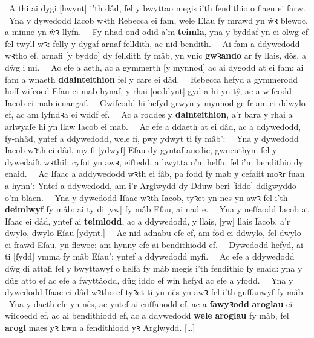 \begin{Parallel}{0.425\textwidth}{0.545\textwidth}
{	~A thi ai dygi [hwynt] i’th dâd, fel y bwyttao megis i’th fendithio o flaen ei farw.\ %
	~Yna y dywedodd Iacob wꝛth Rebecca ei fam, wele Eſau fy mrawd yn ŵꝛ blewoc, a minne yn ŵꝛ llyfn.\ %
	~Fy nhad ond odid a’m \textbf{teimla}, yna y byddaf yn ei olwg ef fel twyll-wꝛ: felly y dygaf arnaf felldith, ac nid bendith.\ %
	~Ai fam a ddywedodd wꝛtho ef, arnafi [y byddo] dy felldith fy mâb, yn vnic \textbf{gwꝛando} ar fy llais, dôs, a dŵg i mi.\ %
	~Ac efe a aeth, ac a gymmerth [y mynnod] ac ai dygodd at ei fam: ai fam a wnaeth \textbf{ddainteithion} fel y care ei dâd.\ %
	~Rebecca hefyd a gymmerodd hoff wiſcoed Eſau ei mab hynaf, y rhai [oeddynt] gyd a hi yn tŷ, ac a wiſcodd Iacob ei mab ieuangaf.\ %
	~Gwiſcodd hi hefyd grwyn y mynnod geifr am ei ddwylo ef, ac am lyfndꝛa ei wddf ef.\ %
	~Ac a roddes y \textbf{dainteithion}, a’r bara y rhai a arlwyaſe hi yn llaw Iacob ei mab.\ %
	~Ac efe a ddaeth at ei dâd, ac a ddywedodd, fy-nhâd, yntef a ddywedodd, wele fi, pwy ydwyt ti fy mâb’:\ %
	~Yna y dywedodd Iacob wꝛth ei dâd, my fi [ydwyf] Eſau dy gyntaf-anedic, gwneuthym fel y dywedaiſt wꝛthif: cyfot yn awꝛ, eiſtedd, a bwytta o’m helfa, fel i’m bendithio dy enaid.\ %
	~Ac Iſaac a addywedodd wꝛth ei fâb, pa fodd fy mab y cefaiſt moꝛr fuan a hynn’: Yntef a ddywedodd, am i’r Arglwydd dy Dduw beri [iddo] ddigwyddo o’m blaen.\ %
	~Yna y dywedodd Iſaac wꝛth Iacob, tyꝛet yn nes yn awꝛ fel i’th \textbf{deimlwyf} fy mâb: ai ty di [yw] fy mâb Eſau, ai nad e.\ %
	~Yna y neſſaodd Iacob at Iſaac ei dâd, yntef ai \textbf{teimlodd}, ac a ddywedodd, y llais, [yw] llais Iacob, a’r dwylo, dwylo Eſau [ydynt.]\ %
	~Ac nid adnabu efe ef, am fod ei ddwylo, fel dwylo ei frawd Eſau, yn flewoc: am hynny efe ai bendithiodd ef.\ %
	~Dywedodd hefyd, ai ti [ſydd] ymma fy mâb Eſau’: yntef a ddywedodd myfi.\ %
	~Ac efe a ddywedodd dŵg di attafi fel y bwyttawyf o helfa fy mâb megis i’th fendithio fy enaid: yna y dûg atto ef ac efe a fwyttâodd, dûg iddo ef win hefyd ac efe a yfodd.\ %
	~Yna y dywedodd Iſaac ei dâd wꝛtho ef tyꝛet ti yn nês yn awꝛ fel i’th guſſanwyf fy mâb.\ %
	~Yna y daeth efe yn nês, ac yntef ai cuſſanodd ef, ac a \textbf{ſawyꝛodd} \textbf{aroglau} ei wiſcoedd ef, ac ai bendithiodd ef, ac a ddywedodd \textbf{wele} \textbf{aroglau} fy mâb, fel \textbf{arogl} maes yꝛ hwn a fendithiodd yꝛ Arglwydd.
	[…]
}
\end{Parallel}

